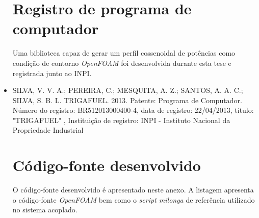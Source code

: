 \documentclass[12pt,openright,twoside,a4paper,english,french,spanish,brazil]{abntex2}
\begin{document}
\begin{anexosenv}
\begin{itemize}
\chapter{Registro de programa de computador}

Uma biblioteca capaz de gerar um perfil cossenoidal de potências como condição de contorno
\textit{OpenFOAM} foi desenvolvida durante esta tese e registrada junto ao INPI.

\item SILVA, V. V. A.; PEREIRA, C.; MESQUITA, A. Z.; SANTOS, A. A. C.; SILVA, S. B. L. TRIGAFUEL. 2013.
  Patente: Programa de Computador. Número do registro: BR512013000400-4, data de registro: 22/04/2013, título: "TRIGAFUEL" , Instituição de registro: INPI - Instituto Nacional da Propriedade Industrial

\chapter{Código-fonte desenvolvido}

O código-fonte desenvolvido é apresentado neste anexo. A listagem apresenta o código-fonte \textit{OpenFOAM} bem como
o \textit{script milonga} de referência utilizado no sistema acoplado.

\begin{landscape}
  
\end{landscape}

%

%

%

\end{itemize}

\end{anexosenv}


\printindex
\end{document}
